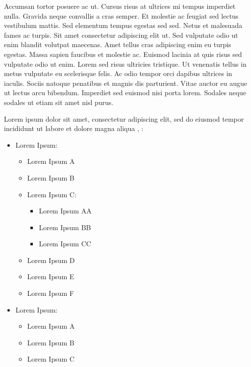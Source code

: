 \documentclass[a4paper,12pt,twoside,openright]{report}
\begin{document}
Accumsan tortor posuere ac ut. Cursus risus at ultrices mi tempus imperdiet nulla. Gravida neque convallis a cras semper. Et molestie ac feugiat sed lectus vestibulum mattis. Sed elementum tempus egestas sed sed. Netus et malesuada fames ac turpis. Sit amet consectetur adipiscing elit ut. Sed vulputate odio ut enim blandit volutpat maecenas. Amet tellus cras adipiscing enim eu turpis egestas. Massa sapien faucibus et molestie ac. Euismod lacinia at quis risus sed vulputate odio ut enim. Lorem sed risus ultricies tristique. Ut venenatis tellus in metus vulputate eu scelerisque felis. Ac odio tempor orci dapibus ultrices in iaculis. Sociis natoque penatibus et magnis dis parturient. Vitae auctor eu augue ut lectus arcu bibendum. Imperdiet sed euismod nisi porta lorem. Sodales neque sodales ut etiam sit amet nisl purus.


Lorem ipsum dolor sit amet, consectetur adipiscing elit, sed do eiusmod tempor incididunt ut labore et dolore magna aliqua \cite{libro1}, \cite{libro2}:


\begin{itemize}
\item Lorem Ipsum:

 \begin{itemize}
 \item Lorem Ipsum A
 \item Lorem Ipsum B
 \item Lorem Ipsum C:
  \begin{itemize}
  \item Lorem Ipsum AA
  \item Lorem Ipsum BB
  \item Lorem Ipsum CC
  \end{itemize}
 \item Lorem Ipsum D
 \item Lorem Ipsum E
 \item Lorem Ipsum F
 \end{itemize}
 
\item Lorem Ipsum:
 \begin{itemize}
 \item Lorem Ipsum A
 \item Lorem Ipsum B
 \item Lorem Ipsum C
 \end{itemize}

\end{itemize}
\end{document}
